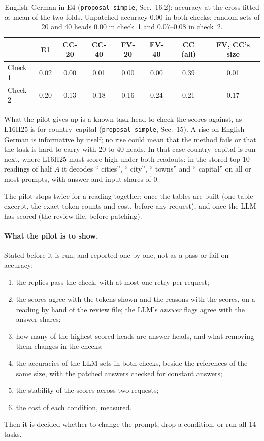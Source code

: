 \documentclass[11pt,a4paper]{article}
\newcommand{\simple}[1]{\texttt{proposal-simple}, #1}
\begin{document}
\begin{table}[H]
\centering\small
\begin{tabular}{@{}lccccccc@{}}
\toprule
 & E1 & CC-20 & CC-40 & FV-20 & FV-40 & CC (all) & FV, CC's size \\
\midrule
Check 1 & 0.02 & 0.00 & 0.01 & 0.00 & 0.00 & 0.39 & 0.01 \\
Check 2 & 0.20 & 0.13 & 0.18 & 0.16 & 0.24 & 0.21 & 0.17 \\
\bottomrule
\end{tabular}
\caption{English--German in E4 (\simple{Sec.~16.2}): accuracy at the cross-fitted $\alpha$, mean of the two folds. Unpatched accuracy 0.00 in both checks; random sets of 20 and 40 heads 0.00 in check~1 and 0.07--0.08 in check~2.}
\label{tab:pilot-e4}
\end{table}

What the pilot gives up is a known task head to check the scores against, as L16H25 is for country--capital (\simple{Sec.~15}). A rise on English--German is informative by itself; no rise could mean that the method fails or that the task is hard to carry with 20 to 40 heads. In that case country--capital is run next, where L16H25 must score high under both readouts: in the stored top-10 readings of half $A$ it decodes `` cities'', `` city'', `` towns'' and `` capital'' on all or most prompts, with answer and input shares of 0.

The pilot stops twice for a reading together: once the tables are built (one table excerpt, the exact token counts and cost, before any request), and once the LLM has scored (the review file, before patching).

\paragraph{What the pilot is to show.} Stated before it is run, and reported one by one, not as a pass or fail on accuracy:
\begin{enumerate}
  \item the replies pass the check, with at most one retry per request;
  \item the scores agree with the tokens shown and the reasons with the scores, on a reading by hand of the review file; the LLM's \emph{answer} flags agree with the answer shares;
  \item how many of the highest-scored heads are answer heads, and what removing them changes in the checks;
  \item the accuracies of the LLM sets in both checks, beside the references of the same size, with the patched answers checked for constant answers;
  \item the stability of the scores across two requests;
  \item the cost of each condition, measured.
\end{enumerate}
Then it is decided whether to change the prompt, drop a condition, or run all 14 tasks.
\end{document}
